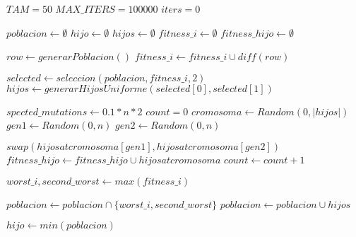 \begin{algorithm}[H]
  \begin{algorithmic}[1]
      \State $TAM = 50$
      \State $MAX\_ITERS = 100000$
      \State $iters = 0$

      \State $poblacion \gets \emptyset$ 
      \State $hijo \gets \emptyset$ 
      \State $hijos \gets \emptyset$
      \State $fitness\_i \gets \emptyset$
      \State $fitness\_hijo \gets \emptyset$
      
        \State $row \gets generarPoblacion()$
        \State $fitness\_i \gets fitness\_i \cup diff(row)$
      \EndFor

        
        \State $selected \gets seleccion(poblacion,fitness\_i,2)$
        \State $hijos \gets generarHijosUniforme(selected[0],selected[1])$
        
        \State $spected\_mutations \gets 0.1*n*2$
        \State $count = 0$
          \State $cromosoma \gets Random(0,|hijos|)$ 
          \State $gen1 \gets Random(0,n)$
          \State $gen2 \gets Random(0,n)$ 

           
            \State $swap(hijos at cromosoma[gen1], hijos at cromosoma[gen2])$ 
            \State $fitness\_hijo \gets fitness\_hijo \cup hijos at cromosoma$ 
          \EndIf
          \State $count \gets count +1 $
        \EndWhile

        \State $worst\_i,second\_worst \gets max(fitness\_i)$ 
       
        \State $poblacion \gets poblacion \cap \{worst\_i,second\_worst\}$
        \State $poblacion \gets poblacion \cup {hijos}$ 
      
      \EndWhile
      
      \State $hijo \gets min(poblacion)$
      \State {}
    \EndFunction
  \end{algorithmic}
\end{algorithm}

